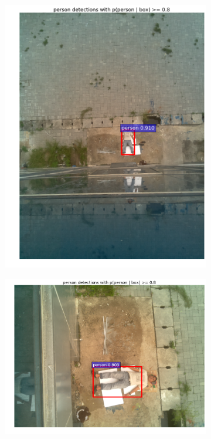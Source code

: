 \begin{figure}[ht]
\begin{subfigure}[b]{0.27\textwidth}
    \includegraphics[width=\textwidth]{4}
    \caption{}
  \end{subfigure}
  \begin{subfigure}[b]{0.27\textwidth}
    \includegraphics[width=\textwidth]{5}

\end{subfigure}
\end{figure}
